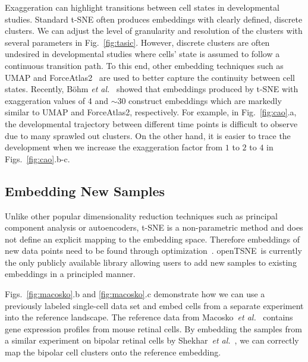 \documentclass[letter]{article}
\newcommand{\opentsne}{\textsf{openTSNE}}
\begin{document}
Exaggeration can highlight transitions between cell states in developmental
studies. Standard t-SNE often produces embeddings with clearly defined, discrete
clusters. We can adjust the level of granularity and resolution of the clusters
with several parameters in Fig.~\ref{fig:tasic}. However, discrete clusters are
often undesired in developmental studies where cells' state is assumed to follow
a continuous transition path. To this end, other embedding techniques such as UMAP and
ForceAtlas2~\cite{jacomy2014forceatlas2} are used to better capture the continuity
between cell states. Recently, B{\"o}hm \textit{et al.}~\cite{bohm2020unifying}
showed that embeddings produced by t-SNE with exaggeration values of 4 and
$\sim30$ construct embeddings which are markedly similar to UMAP and
ForceAtlas2, respectively. For example, in Fig.~\ref{fig:cao}.a, the
developmental trajectory between different time points is difficult to observe
due to many sprawled out clusters. On the other hand, it is easier to trace the
development when we increase the exaggeration factor from $1$ to $2$ to $4$ in
Figs.~\ref{fig:cao}.b-c.

\subsection*{Embedding New Samples}

Unlike other popular dimensionality reduction techniques such as principal
component analysis or autoencoders, t-SNE is a non-parametric method and does
not define an explicit mapping to the embedding space. Therefore embeddings of
new data points need to be found through
optimization~\cite{policar2019embedding}. \opentsne\ is currently the only
publicly available library allowing users to add new samples to existing
embeddings in a principled manner.

Figs.~\ref{fig:macosko}.b and \ref{fig:macosko}.c demonstrate how we can use a
previously labeled single-cell data set and embed cells from a separate
experiment into the reference landscape. The reference data from
Macosko~\textit{et al.}~\cite{macosko2015highly} contains gene expression
profiles from mouse retinal cells. By embedding the samples from a similar
experiment on bipolar retinal cells by Shekhar~\textit{et
al.}~\cite{shekhar2016comprehensive}, we can correctly map the bipolar cell
clusters onto the reference embedding.
\end{document}
